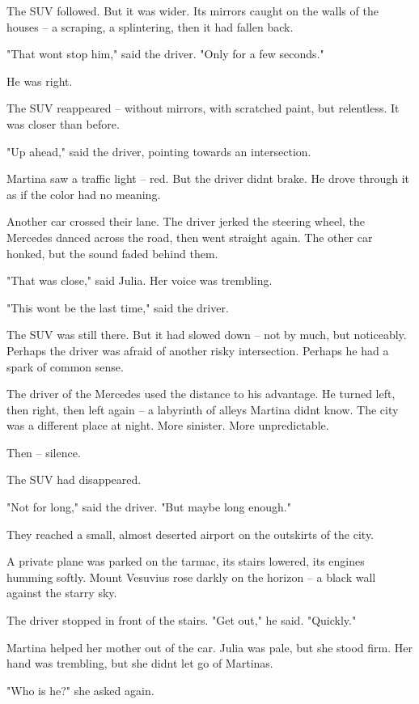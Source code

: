 \documentclass[
]{article}
\begin{document}
The SUV followed. But it was wider. Its mirrors caught on the walls of the houses -- a scraping, a splintering, then it had fallen back.

"That won\textquotesingle t stop him," said the driver. "Only for a few seconds."

He was right.

The SUV reappeared -- without mirrors, with scratched paint, but relentless. It was closer than before.

"Up ahead," said the driver, pointing towards an intersection.

Martina saw a traffic light -- red. But the driver didn\textquotesingle t brake. He drove through it as if the color had no meaning.

Another car crossed their lane. The driver jerked the steering wheel, the Mercedes danced across the road, then went straight again. The other car honked, but the sound faded behind them.

"That was close," said Julia. Her voice was trembling.

"This won\textquotesingle t be the last time," said the driver.

The SUV was still there. But it had slowed down -- not by much, but noticeably. Perhaps the driver was afraid of another risky intersection. Perhaps he had a spark of common sense.

The driver of the Mercedes used the distance to his advantage. He turned left, then right, then left again -- a labyrinth of alleys Martina didn\textquotesingle t know. The city was a different place at night. More sinister. More unpredictable.

Then -- silence.

The SUV had disappeared.

"Not for long," said the driver. "But maybe long enough."

They reached a small, almost deserted airport on the outskirts of the city.

A private plane was parked on the tarmac, its stairs lowered, its engines humming softly. Mount Vesuvius rose darkly on the horizon -- a black wall against the starry sky.

The driver stopped in front of the stairs. "Get out," he said. "Quickly."

Martina helped her mother out of the car. Julia was pale, but she stood firm. Her hand was trembling, but she didn\textquotesingle t let go of Martina\textquotesingle s.

"Who is he?" she asked again.
\end{document}
